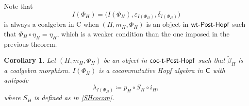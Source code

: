 \documentclass[10pt,a4paper]{amsart}
\numberwithin{equation}{section}
\newtheorem{Corollary}[Theorem]{Corollary}
\begin{document}
\begin{Remark}
Note that
\[
I(\Phi_{H})=\big(I(\Phi_{H}),\varepsilon_{I(\Phi_{H})},\delta_{I(\Phi_{H})}\big)
\]
is always a coalgebra in {\sf C} when $(H,m_{H},\Phi_{H})$ is an object in ${\sf wt}\textnormal{-}\sf{Post}\textnormal{-}\sf{Hopf}$ such that $\Phi_{H}\circ\eta_{H}=\eta_{H}$, which is a weaker condition than the one imposed in the previous theorem.
\end{Remark}
\begin{Corollary}\label{halgIphi}
Let $(H,m_{H},\Phi_{H})$ be an object in $\sf{coc}\textnormal{-}\sf{t}\textnormal{-}\sf{Post}\textnormal{-}\sf{Hopf}$ such that $\tilde{\beta}_{H}$ is a coalgebra morphism. $I(\Phi_{H})$ is a cocommutative Hopf algebra in $\sf{C}$ with antipode
\begin{equation}\label{deflambdaI}
\lambda_{I(\Phi_{H})}\coloneqq p_{H}\circ S_{H}\circ i_{H},
\end{equation}
where $S_{H}$ is defined as in \eqref{SHcocom}.
\end{Corollary}
\end{document}
